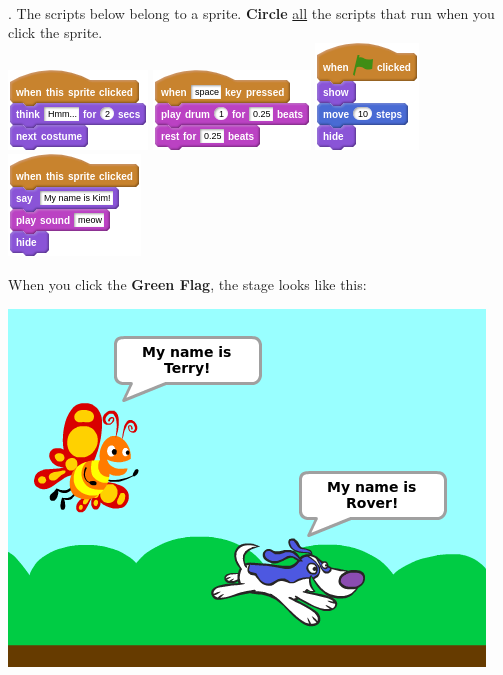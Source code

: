 \documentclass[letterpaper,12pt]{article}
\begin{document}
\noindent \dotfill \\

. The scripts below belong to a sprite. \textbf{Circle} \underline{all} the scripts that run when you click the sprite. \\

\includegraphics[scale=.7,valign=t]{q3_script0.png} \hspace{1cm}
\includegraphics[scale=.7,valign=t]{q3_script1.png} \hspace{1cm}
\includegraphics[scale=.7,valign=t]{q3_script2.png} \hspace{1cm}
\includegraphics[scale=.7,valign=t]{q3_script3.png} \hspace{1cm}


\newpage
\noindent When you click the \textbf{Green Flag}, the stage looks like this:
\begin{center}
\includegraphics[scale=.5]{q4_stage.png}
\end{center}
\end{document}
